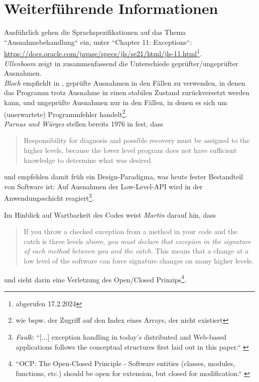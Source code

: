 \section{Weiterführende Informationen}
Ausführlich gehen die Sprachspezifikationen auf das Thema ``Ausnahmebehandlung`` ein, unter ``Chapter 11: Exceptions``: \url{https://docs.oracle.com/javase/specs/jls/se21/html/jls-11.html}\footnote{abgerufen 17.2.2024}.\\

\noindent
\textit{Ullenboom} zeigt in \cite[589, Abschnitt 9.3.9]{Ull23} zusammenfassend die Unterschiede geprüfter/ungeprüfter Ausnahmen.\\

\noindent
\textit{Bloch} empfiehlt in \cite[296]{Blo17}, geprüfte Ausnahmen in den Fällen zu verwenden, in denen das Programm trotz Ausnahme in einen stabilen Zustand zurückversetzt werden kann, und ungeprüfte Ausnahmen nur in den Fällen, in denen es sich um (unerwartete) Programmfehler handelt\footnote{wie bspw. der Zugriff auf den Index eines Arrays, der nicht existiert}.\\

\noindent
\textit{Parnas und Würges} stellen bereits 1976 in \cite{PW17} fest, dass

\blockquote[]{
Responsibility for diagnosis and possible recovery must be assigned to the higher levels, because the lower level program does not have sufficient knowledge to determine what was desired.
}

und empfehlen damit früh ein Design-Paradigma, was heute fester Bestandteil von Software ist: Auf Ausnahmen der Low-Level-API wird in der Anwendungsschicht reagiert\footnote{
\textit{Faulk}: ``[...] exception handling in today's distributed and Web-based applications follows the conceptual structures first laid out in this paper.`` \cite[229]{HW01}
}.

\noindent
Im Hinblick auf Wartbarkeit des Codes weist \textit{Martin} darauf hin, dass

\blockquote[{\cite[107, Hervorhebungen i.O.]{Mar08}}]{
If you throw a checked exception from a method in your code and the catch is three levels above, \textit{you must declare that excepion in the signature of each method between you and the catch}. This means that a change at a low level of the software can force signature changes on many higher levels.
}

und sieht darin eine Verletzung des Open/Closed Prinzips\footnote{
    ``OCP: The Open-Closed Principle - Software entities (classes, modules, functions, etc.) should be open for extension, but closed for modification.`` \cite[99]{Mar03}
}.